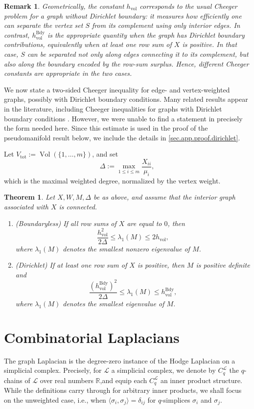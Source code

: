 \documentclass{article}
\newtheorem{theorem}{Theorem}[section]
\newtheorem{remark}{Remark}[section]
\newcommand{\LL}{\mathcal{L}}
\begin{document}
\begin{remark}
Geometrically, the constant \(h_{\mathrm{vol}}\) corresponds to the usual Cheeger problem for a graph without Dirichlet boundary: it measures how efficiently one can separate the vertex set \(S\) from its complement using only \emph{interior} edges. In contrast, \(h_{\mathrm{vol}}^{\mathrm{Bdy}}\) is the appropriate quantity when the graph has Dirichlet boundary contributions, equivalently when at least one row sum of \(X\) is positive. In that case, \(S\) can be separated not only along edges connecting it to its complement, but also along the boundary encoded by the row-sum surplus. Hence, different Cheeger constants are appropriate in the two cases.
\end{remark}
We now state a two-sided Cheeger inequality for edge- and vertex-weighted graphs, possibly with Dirichlet boundary conditions. Many related results appear in the literature, including Cheeger inequalities for graphs with Dirichlet boundary conditions \cite{MR1421568}. However, we were unable to find a statement in precisely the form needed here. Since this estimate is used in the proof of the pseudomanifold result below, we include the details in \cref{sec.app.proof.dirichlet}.

Let \(V_{\mathrm{tot}}:=\operatorname{Vol}(\{1,\ldots,m\})\), and set
\[
\Delta:=\max_{1\leq i\leq m}\frac{X_{ii}}{\mu_i},
\]
which is the maximal weighted degree, normalized by the vertex weight.


\begin{theorem}
\label{thm:weighted_graph_cheeger_dirichlet}
Let \(X,W,M,\Delta\) be as above, and assume that the interior graph associated with \(X\) is connected.
\begin{enumerate}
    \item (Boundaryless) If all row sums of \(X\) are equal to \(0\), then
    \[
    \frac{h_{\mathrm{vol}}^2}{2\Delta}\leq \lambda_1(M)\leq 2h_{\mathrm{vol}},
    \]
    where \(\lambda_1(M)\) denotes the smallest nonzero eigenvalue of \(M\).
    \item (Dirichlet) If at least one row sum of \(X\) is positive, then \(M\) is positive definite and
    \[
    \frac{(h_{\mathrm{vol}}^{\mathrm{Bdy}})^2}{2\Delta}\leq \lambda_{1}(M)\leq h_{\mathrm{vol}}^{\mathrm{Bdy}},
    \]
    where \(\lambda_1(M)\) denotes the smallest eigenvalue of \(M\).
\end{enumerate}
\end{theorem}


\section{Combinatorial Laplacians}
\label{sec.laplacians}
The graph Laplacian is the degree-zero instance of the Hodge Laplacian on a simplicial complex. Precisely, for $\LL$ a simplicial complex, we denote by $C_q^\LL$ the $q$-chains of $\LL$ over real numbers $\mathbb{R}$,and equip each $C_{q}^\LL$ an inner product structure. While the definitions carry through for arbitrary inner products, we shall focus on the unweighted case, i.e., when $\langle \sigma_i, \sigma_j\rangle = \delta_{ij}$ for $q$-simplices $\sigma_i$ and $\sigma_j$. 
\end{document}
